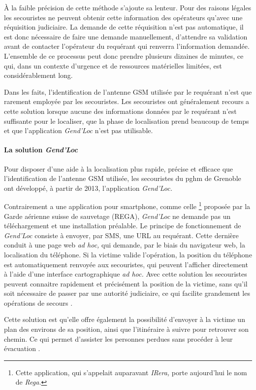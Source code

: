 À la faible précision de cette méthode s'ajoute sa lenteur. Pour des
raisons légales les secouristes ne peuvent obtenir cette information
des opérateurs qu'avec une réquisition judiciaire. La demande de cette
réquisition n'est pas automatique, il est donc nécessaire de faire une
demande manuellement, d'attendre sa validation avant de contacter
l'opérateur du requérant qui renverra l'information
demandée. L'ensemble de ce processus peut donc prendre plusieurs
dizaines de minutes, ce qui, dans un contexte d'urgence et de
ressources matérielles limitées, est considérablement long.

Dans les faits, l'identification de l'antenne GSM utilisée par le
requérant n'est que rarement employée par les secouristes. Les
secouristes ont généralement recours a cette solution lorsque aucune
des informations données par le requérant n'est suffisante pour le
localiser, que la phase de localisation prend beaucoup de temps et que
l’application \emph{Gend'Loc} n'est pas utilisable.

\paragraph{La solution \emph{Gend'Loc}}

Pour disposer d'une aide à la localisation plus rapide, précise et
efficace que l'identification de l'antenne GSM utilisée, les
secouristes du \ac{pghm} de Grenoble ont développé, à partir de 2013,
l’application \emph{Gend'Loc.}

Contrairement a une application pour smartphone, comme celle
\footnote{Cette application, qui s’appelait auparavant \emph{IRera,}
  porte aujourd'hui le nom de \emph{Rega.}}  proposée par la Garde
aérienne suisse de sauvetage (REGA), \emph{Gend'Loc} ne demande pas un
téléchargement et une installation préalable. Le principe de
fonctionnement de \emph{Gend'Loc} consiste à envoyer, par SMS, une URL
au requérant. Cette dernière conduit à une page web \emph{ad hoc,} qui
demande, par le biais du navigateur web, la localisation du
téléphone. Si la victime valide l'opération, la position du téléphone
est automatiquement renvoyée aux secouristes, qui peuvent l'afficher
directement à l'aide d'une interface cartographique \emph{ad hoc.}
Avec cette solution les secouristes peuvent connaitre rapidement et
précisément la position de la victime, sans qu'il soit nécessaire de
passer par une autorité judiciaire, ce qui facilite grandement les
opérations de secours \autocite{Muscat2015}.

Cette solution est qu'elle offre également la possibilité d'envoyer à
la victime un plan des environs de sa position, ainsi que l'itinéraire
à suivre pour retrouver son chemin. Ce qui permet d'assister les
personnes perdues sans procéder à leur évacuation
\autocite{Muscat2015}.

